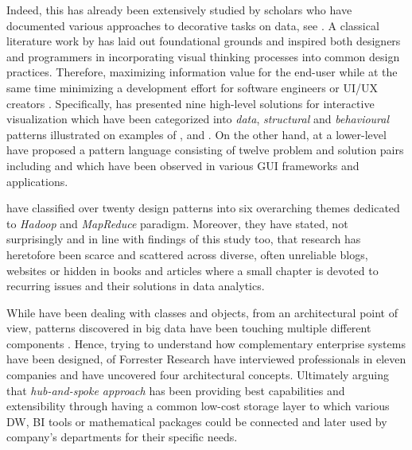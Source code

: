 Indeed, this has already been extensively studied by scholars who have documented various approaches to  decorative tasks on data, see \textcites[5]{ChenHong2004}{WareColin2013}{HeffreMheer2006}.
A classical literature work by \textcite{Tutfe1883} has laid out foundational grounds and inspired both designers and programmers in incorporating visual thinking processes into common design practices.
Therefore, maximizing information value for the end-user while at the same time minimizing a development effort for software engineers or \ac{UI/UX} creators \parencite{WareColin2013}.
Specifically, \textcite{ChenHong2004} has presented nine high-level solutions for interactive visualization which have been categorized into \emph{data}, \emph{structural} and \emph{behavioural} patterns illustrated on examples of ,  and .
On the other hand, at a lower-level \textcite{HeffreMheer2006} have proposed a pattern language consisting of twelve problem and solution pairs including  and  which have been observed in various \ac{GUI} frameworks and applications.

\textcite{MinerDonald2012} have classified over twenty design patterns into six overarching themes dedicated to \emph{Hadoop} and \emph{MapReduce} paradigm. 
Moreover, they have stated, not surprisingly and in line with findings of this study too, that research has heretofore been scarce and scattered across diverse, often unreliable blogs, websites or hidden in books and articles where a small chapter is devoted to recurring issues and their solutions in data analytics. 

While \textcite{GoF2002} have been dealing with classes and objects, from an architectural point of view, patterns discovered in big data have been touching multiple different components \parencites{Fabian2013}{Fowler2002}. 
Hence, trying to understand how complementary enterprise systems have been designed, \textcite{Forrester2013} of Forrester Research have interviewed professionals in eleven companies and have uncovered four architectural concepts. 
Ultimately arguing that \emph{hub-and-spoke approach} has been providing best capabilities and extensibility through having a common low-cost storage layer to which various \ac{DW}, \ac{BI} tools or mathematical packages could be connected and later used by company's departments for their specific needs.

